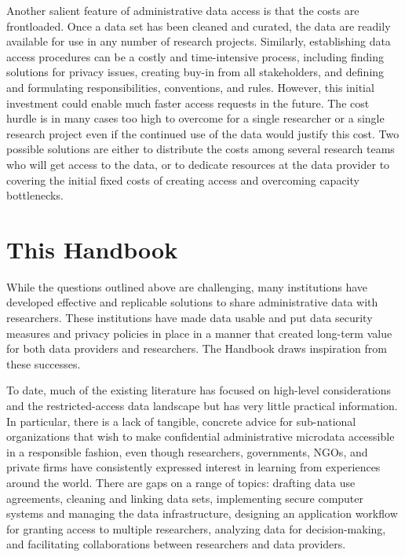 \documentclass[
]{book}
\begin{document}
Another salient feature of administrative data access is that the costs are frontloaded. Once a data set has been cleaned and curated, the data are readily available for use in any number of research projects. Similarly, establishing data access procedures can be a costly and time-intensive process, including finding solutions for privacy issues, creating buy-in from all stakeholders, and defining and formulating responsibilities, conventions, and rules. However, this initial investment could enable much faster access requests in the future. The cost hurdle is in many cases too high to overcome for a single researcher or a single research project even if the continued use of the data would justify this cost. Two possible solutions are either to distribute the costs among several research teams who will get access to the data, or to dedicate resources at the data provider to covering the initial fixed costs of creating access and overcoming capacity bottlenecks.

\hypertarget{this-handbook}{%
\section{This Handbook}\label{this-handbook}}

While the questions outlined above are challenging, many institutions have developed effective and replicable solutions to share administrative data with researchers. These institutions have made data usable and put data security measures and privacy policies in place in a manner that created long-term value for both data providers and researchers. The Handbook draws inspiration from these successes.

To date, much of the existing literature has focused on high-level considerations and the restricted-access data landscape \citep{harron2017} but has very little practical information. In particular, there is a lack of tangible, concrete advice for sub-national organizations that wish to make confidential administrative microdata accessible in a responsible fashion, even though researchers, governments, NGOs, and private firms have consistently expressed interest in learning from experiences around the world. There are gaps on a range of topics: drafting data use agreements, cleaning and linking data sets, implementing secure computer systems and managing the data infrastructure, designing an application workflow for granting access to multiple researchers, analyzing data for decision-making, and facilitating collaborations between researchers and data providers.
\end{document}
